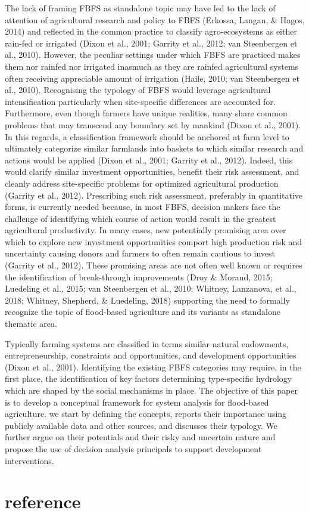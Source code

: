 \documentclass[]{elsarticle} %
\begin{document}
The lack of framing FBFS as standalone topic may have led to the lack of attention of agricultural research and policy to FBFS (Erkossa, Langan, \& Hagos, 2014) and reflected in the common practice to classify agro-ecosystems as either rain-fed or irrigated (Dixon et al., 2001; Garrity et al., 2012; van Steenbergen et al., 2010). However, the peculiar settings under which FBFS are practiced makes them nor rainfed nor irrigated inasmuch as they are rainfed agricultural systems often receiving appreciable amount of irrigation (Haile, 2010; van Steenbergen et al., 2010). Recognising the typology of FBFS would leverage agricultural intensification particularly when site-specific differences are accounted for. Furthermore, even though farmers have unique realities, many share common problems that may transcend any boundary set by mankind (Dixon et al., 2001). In this regards, a classification framework should be anchored at farm level to ultimately categorize similar farmlands into baskets to which similar research and actions would be applied (Dixon et al., 2001; Garrity et al., 2012). Indeed, this would clarify similar investment opportunities, benefit their risk assessment, and cleanly address site-specific problems for optimized agricultural production (Garrity et al., 2012). Prescribing such risk assessment, preferably in quantitative forms, is currently needed because, in most FBFS, decision makers face the challenge of identifying which course of action would result in the greatest agricultural productivity. In many cases, new potentially promising area over which to explore new investment opportunities comport high production risk and uncertainty causing donors and farmers to often remain cautious to invest (Garrity et al., 2012). These promising areas are not often well known or requires the identification of break-through improvements (Droy \& Morand, 2015; Luedeling et al., 2015; van Steenbergen et al., 2010; Whitney, Lanzanova, et al., 2018; Whitney, Shepherd, \& Luedeling, 2018) supporting the need to formally recognize the topic of flood-based agriculture and its variants as standalone thematic area.

Typically farming systems are classified in terms similar natural endowments, entrepreneurship, constraints and opportunities, and development opportunities (Dixon et al., 2001). Identifying the existing FBFS categories may require, in the first place, the identification of key factors determining type-specific hydrology which are shaped by the social mechanisms in place. The objective of this paper is to develop a conceptual framework for system analysis for flood-based agriculture. we start by defining the concepts, reports their importance using publicly available data and other sources, and discusses their typology. We further argue on their potentials and their risky and uncertain nature and propose the use of decision analysis principals to support development interventions.

\hypertarget{VI}{%
\section{reference}\label{VI}}
\end{document}
